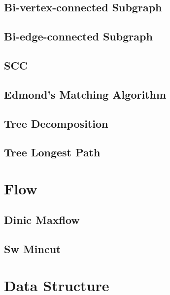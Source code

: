 \documentclass[10pt,twocolumn,oneside]{article}
\begin{document}
\subsection{Bi-vertex-connected Subgraph}

\subsection{Bi-edge-connected Subgraph}

\subsection{SCC}

%
\subsection{Edmond's Matching Algorithm}

\subsection{Tree Decomposition}

\subsection{Tree Longest Path}


\section{Flow}

\subsection{Dinic Maxflow}

\subsection{Sw Mincut}


\section{Data Structure}
\end{document}
